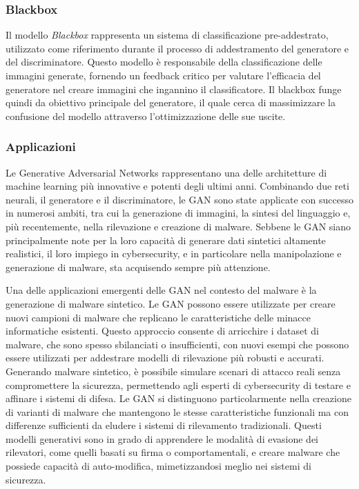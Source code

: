 \newpage

\subsubsection{Blackbox}
Il modello \emph{Blackbox} rappresenta un sistema di classificazione pre-addestrato, utilizzato come riferimento durante il processo di addestramento del generatore e del discriminatore. Questo modello è responsabile della classificazione delle immagini generate, fornendo un feedback critico per valutare l'efficacia del generatore nel creare immagini che ingannino il classificatore. Il blackbox funge quindi da obiettivo principale del generatore, il quale cerca di massimizzare la confusione del modello attraverso l'ottimizzazione delle sue uscite.


\subsubsection{Applicazioni}
Le Generative Adversarial Networks rappresentano una delle architetture di machine learning più innovative e potenti degli ultimi anni. Combinando due reti neurali, il generatore e il discriminatore, le GAN sono state applicate con successo in numerosi ambiti, tra cui la generazione di immagini, la sintesi del linguaggio e, più recentemente, nella rilevazione e creazione di malware. Sebbene le GAN siano principalmente note per la loro capacità di generare dati sintetici altamente realistici, il loro impiego in cybersecurity, e in particolare nella manipolazione e generazione di malware, sta acquisendo sempre più attenzione.

Una delle applicazioni emergenti delle GAN nel contesto del malware è la generazione di malware sintetico. Le GAN possono essere utilizzate per creare nuovi campioni di malware che replicano le caratteristiche delle minacce informatiche esistenti. Questo approccio consente di arricchire i dataset di malware, che sono spesso sbilanciati o insufficienti, con nuovi esempi che possono essere utilizzati per addestrare modelli di rilevazione più robusti e accurati. Generando malware sintetico, è possibile simulare scenari di attacco reali senza compromettere la sicurezza, permettendo agli esperti di cybersecurity di testare e affinare i sistemi di difesa.
Le GAN si distinguono particolarmente nella creazione di varianti di malware che mantengono le stesse caratteristiche funzionali ma con differenze sufficienti da eludere i sistemi di rilevamento tradizionali. Questi modelli generativi sono in grado di apprendere le modalità di evasione dei rilevatori, come quelli basati su firma o comportamentali, e creare malware che possiede capacità di auto-modifica, mimetizzandosi meglio nei sistemi di sicurezza.

